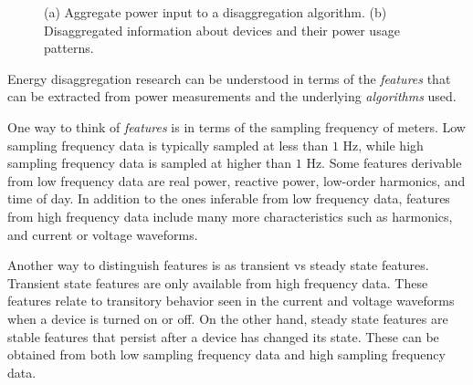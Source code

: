 \begin{figure}[ht]
	\caption{ (a) Aggregate power input to a disaggregation
algorithm. (b) Disaggregated information
about devices and their power usage patterns.}
	\label{fig_energyDisaggDefinition}
\end{figure}

Energy disaggregation research can be understood in terms of 
the {\em features} that can be extracted from power measurements and
the underlying {\em algorithms} used.

One way to think of {\it features}
is in terms of
the sampling frequency
of meters. Low sampling frequency data is typically sampled at less than
$1$ Hz, while high sampling frequency data is sampled at higher than $1$ Hz.
Some features derivable from low frequency data are real power, reactive power,
low-order harmonics, and time of day. In addition to the ones inferable from
low frequency data, features from high frequency data include
many more characteristics such as harmonics, and current or voltage waveforms.

Another way to distinguish features is as transient vs steady state features.
Transient state features are only available from high frequency data. 
These features relate to transitory behavior seen in the current and voltage
waveforms when a device is turned on or off. 
On the other hand, steady state features are stable features that persist
after a device has changed its state. These
can be obtained from both low sampling frequency data and high sampling
frequency data. 

